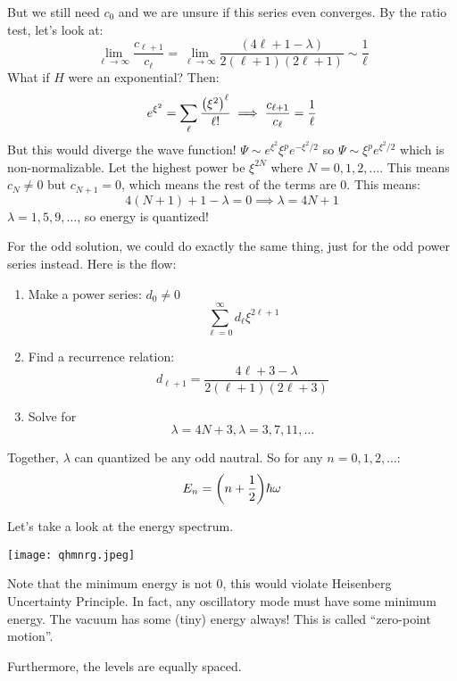 But we still need $c_0$ and we are unsure if this series even converges. By the ratio test, let's look at:
\[ \lim_{\ell \to \infty} \frac{c_{\ell + 1}}{c_{\ell}} = \lim_{\ell \to \infty } \frac{(4\ell + 1 - \lambda)}{2(\ell + 1)(2 \ell + 1)} \sim \frac{1}{\ell} \]
What if $H$ were an exponential? Then:
\begin{align*}
    e^{\xi^2} = \sum_{\ell} \frac{\qty(\xi^2)^{\ell}}{\ell!} \implies \frac{c_{\ell + 1}}{c_{\ell}} = \frac{1}{\ell}
\end{align*}
But this would diverge the wave function! $\Psi \sim e^{\xi^2} \xi^p e^{-\xi^2/2}$
so $\Psi \sim \xi^p e^{\xi^2/2}$ which is non-normalizable. Let the highest power be $\xi^{2N}$ where $N = 0, 1, 2, \dots$.
This means $c_N \neq 0$ but $c_{N + 1} = 0$, which means the rest of the terms are 0. This means:
\[ 4(N + 1) + 1 - \lambda = 0 \implies \lambda = 4N + 1\]
$\lambda = 1, 5, 9, \dots$, so energy is quantized!

For the odd solution, we could do exactly the same thing, just for the odd power series instead. Here is the flow:
\begin{enumerate}
    \item Make a power series: $d_0 \neq 0$
    \[ \sum_{\ell = 0}^{\infty} d_{\ell} \xi^{2\ell + 1} \]
    \item Find a recurrence relation:
    \[ d_{\ell + 1} = \frac{4 \ell + 3 - \lambda}{2(\ell + 1)(2 \ell + 3)} \]
    \item Solve for
    \[ \lambda = 4N + 3, \lambda = 3, 7, 11, \dots \]
\end{enumerate}
Together, $\lambda$ can quantized be any odd nautral. So for any $n = 0, 1, 2, \dots$:
\[ E_n = \qty(n + \frac{1}{2}) \hbar \omega \]

Let's take a look at the energy spectrum.

\texttt{[image: qhmnrg.jpeg]}

Note that the minimum energy is not 0, this would violate Heisenberg Uncertainty Principle.
In fact, any oscillatory mode must have some minimum energy. The vacuum has some
(tiny) energy always! This is called ``zero-point motion''.

Furthermore, the levels are equally spaced.